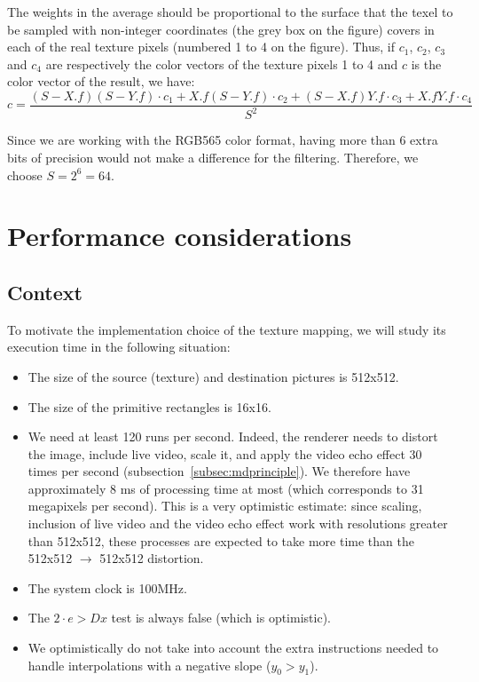\documentclass[a4paper,11pt]{kthesis}
\begin{document}
The weights in the average should be proportional to the surface that the texel to be sampled with non-integer coordinates (the grey box on the figure) covers in each of the real texture pixels (numbered 1 to 4 on the figure). Thus, if $c_{1}$, $c_{2}$, $c_{3}$ and $c_{4}$ are respectively the color vectors of the texture pixels 1 to 4 and $c$ is the color vector of the result, we have:
\begin{equation}\label{eq:bfilter}
c = \frac{(S-X.f)(S-Y.f) \cdot c_{1} + X.f(S-Y.f) \cdot c_{2} + (S-X.f)Y.f \cdot c_{3} + X.fY.f \cdot c_{4}}{S^{2}}
\end{equation}

Since we are working with the RGB565 color format, having more than 6 extra bits of precision would not make a difference for the filtering. Therefore, we choose $S = 2^{6} = 64$.

\section{Performance considerations}
\subsection{Context}
\label{subsec:perfcontext}
To motivate the implementation choice of the texture mapping, we will study its execution time in the following  situation:
\begin{itemize}
\item The size of the source (texture) and destination pictures is 512x512.
\item The size of the primitive rectangles is 16x16.
\item We need at least 120 runs per second. Indeed, the renderer needs to distort the image, include live video, scale it, and apply the video echo effect 30 times per second (subsection~\ref{subsec:mdprinciple}). We therefore have approximately 8 ms of processing time at most (which corresponds to 31 megapixels per second). This is a very optimistic estimate: since scaling, inclusion of live video and the video echo effect work with resolutions greater than 512x512, these processes are expected to take more time than the 512x512 $\rightarrow$ 512x512 distortion.
\item The system clock is 100MHz.
\item The $2\cdot e > Dx$ test is always false (which is optimistic).
\item We optimistically do not take into account the extra instructions needed to handle interpolations with a negative slope ($y_{0} > y_{1}$).
\end{itemize}
\end{document}
